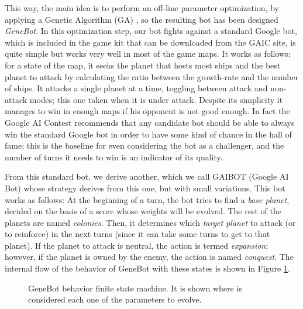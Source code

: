 \documentclass{llncs}
\begin{document}
This way, the main idea is to perform an off-line parameter
optimization, by applying a Genetic Algorithm (GA)
\cite{GAs_Michalewicz96}, so the resulting bot has been
designed \textit{GeneBot}. In this optimization step, our bot
fights against a standard Google bot, which is included in the game
kit that can be downloaded from the GAIC site, is quite
simple but works very well in most of the game maps. It works as
follows: for a state of
the map, it seeks the planet that hosts most ships and the best planet
to attack by calculating the ratio between the growth-rate and the
number of ships. It attacks a single planet at a time, toggling
between attack and non-attack modes; this one taken when it is under
attack. Despite its simplicity it manages to win in enough maps if his
opponent is not good enough.  %
In fact the Google AI Contest recommends that any
candidate bot should be able to always win the standard Google bot in
order to have some kind of chance in the hall of fame; this is the
baseline for even considering the bot as a challenger, and the number
of turns it needs to win is an indicator of its quality. 

From this standard bot, we derive another, which we call GAIBOT (Google
AI Bot) whose strategy derives from this one, but with small
variations. This bot works as follows: At the beginning of a turn, the bot tries to find a \textit{base
  planet}, decided on the basis of a score whose weights will be evolved. The rest of the planets are named \textit{colonies}.
Then, it determines which \textit{target planet} to attack (or to reinforce) in 
the next turns (since it can take some turns to get to that planet). 
If the planet to attack is neutral, the action is termed \textit{expansion}; 
however, if the planet is owned by the enemy, the action is named 
\textit{conquest}. The internal flow of the behavior of GeneBot with
these states is shown in Figure
\ref{figura:diagram}. 
%
\begin{figure}[ht]
\begin{center}
\end{center}
\caption{GeneBot behavior finite state machine. It is shown where is considered each one of the parameters to evolve.}
\label{figura:diagram}
\end{figure}
%
\end{document}
